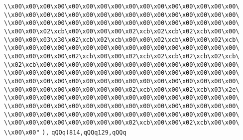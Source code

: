 \verb|\\x00\x00\x00\x00\x00\x00\x00\x00\x00\x00\x00\x00\x00\x00\x00\x00\|\newline
\verb|\\x00\x00\x00\x00\x00\x00\x00\x00\x00\x00\x00\x00\x00\x00\x00\x00\|\newline
\verb|\\x00\x00\x00\x00\x00\x00\x00\x00\x00\x00\x00\x00\x00\x00\x00\x00\|\newline
\verb|\\x00\x00\x02\xcb\x00\x00\x00\x00\x02\xcb\x02\xcb\x02\xcb\x00\x00\|\newline
\verb|\\x00\x00\x03\x30\x02\xcb\x02\xcb\x00\x00\x02\xcb\x00\x00\x02\xcb\|\newline
\verb|\\x00\x00\x00\x00\x00\x00\x00\x00\x00\x00\x00\x00\x00\x00\x00\x00\|\newline
\verb|\\x00\x00\x00\x00\x02\xcb\x00\x00\x02\xcb\x02\xcb\x02\xcb\x02\xcb\|\newline
\verb|\\x02\xcb\x00\x00\x00\x00\x00\x00\x00\x00\x00\x00\x00\x00\x00\x00\|\newline
\verb|\\x00\x00\x00\x00\x00\x00\x00\x00\x00\x00\x00\x00\x00\x00\x00\x00\|\newline
\verb|\\x00\x00\x00\x00\x00\x00\x00\x00\x00\x00\x00\x00\x00\x00\x00\x00\|\newline
\verb|\\x00\x00\x00\x00\x00\x00\x00\x00\x02\xcb\x00\x00\x02\xcb\x03\x2e\|\newline
\verb|\\x00\x00\x00\x00\x00\x00\x00\x00\x00\x00\x00\x00\x00\x00\x00\x00\|\newline
\verb|\\x00\x00\x00\x00\x00\x00\x00\x00\x00\x00\x00\x00\x00\x00\x00\x00\|\newline
\verb|\\x00\x00\x00\x00\x00\x00\x00\x00\x00\x00\x00\x00\x00\x00\x00\x00\|\newline
\verb|\\x00\x00\x00\x00\x00\x00\x00\x00\x02\xcb\x00\x00\x02\xcb\x00\x00\|\newline
\verb|\\x00\x00"|\newline
\verb|),|\newline
\verb|qQQq(814,qQQq129,qQQq|\newline
